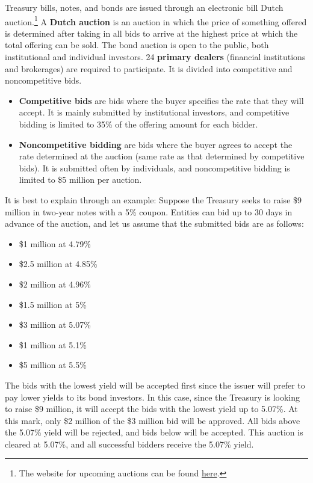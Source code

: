 \documentclass{article}
\begin{document}
    Treasury bills, notes, and bonds are issued through an electronic bill Dutch auction.\footnote{The website for upcoming auctions can be found \href{https://www.treasurydirect.gov/auctions/upcoming/}{here}.} A \textbf{Dutch auction} is an auction in which the price of something offered is determined after taking in all bids to arrive at the highest price at which the total offering can be sold. The bond auction is open to the public, both institutional and individual investors. 24 \textbf{primary dealers} (financial institutions and brokerages) are required to participate. It is divided into competitive and noncompetitive bids.
    \begin{itemize}
        \item \textbf{Competitive bids} are bids where the buyer specifies the rate that they will accept. It is mainly submitted by institutional investors, and competitive bidding is limited to 35\% of the offering amount for each bidder.
        \item \textbf{Noncompetitive bidding} are bids where the buyer agrees to accept the rate determined at the auction (same rate as that determined by competitive bids). It is submitted often by individuals, and noncompetitive bidding is limited to \$5 million per auction.
    \end{itemize}

    \begin{example}
      It is best to explain through an example: Suppose the Treasury seeks to raise \$9 million in two-year notes with a 5\% coupon. Entities can bid up to 30 days in advance of the auction, and let us assume that the submitted bids are as follows:
      \begin{itemize}
          \item \$1 million at 4.79\%
          \item \$2.5 million at 4.85\%
          \item \$2 million at 4.96\%
          \item \$1.5 million at 5\%
          \item \$3 million at 5.07\%
          \item \$1 million at 5.1\%
          \item \$5 million at 5.5\%
      \end{itemize}
      The bids with the lowest yield will be accepted first since the issuer will prefer to pay lower yields to its bond investors. In this case, since the Treasury is looking to raise \$9 million, it will accept the bids with the lowest yield up to 5.07\%. At this mark, only \$2 million of the \$3 million bid will be approved. All bids above the 5.07\% yield will be rejected, and bids below will be accepted. This auction is cleared at 5.07\%, and all successful bidders receive the 5.07\% yield.
    \end{example}
\end{document}
